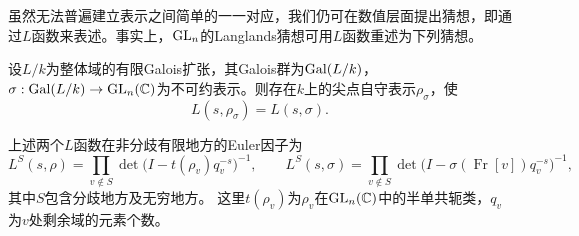 虽然无法普遍建立表示之间简单的一一对应，我们仍可在数值层面提出猜想，即通过$L$函数来表述。事实上，$\operatorname{GL}_n$的Langlands猜想可用$L$函数重述为下列猜想。
\begin{conjecture}[Langlands互反猜想]\label{L20S2O3}
设$L/k$为整体域的有限Galois扩张，其Galois群为$\operatorname{Gal}(L/k)$，$\sigma:\operatorname{Gal}(L/k)\to\operatorname{GL}_n(\mathbb{C})$为不可约表示。则存在$k$上的尖点自守表示$\rho_\sigma$，使
\[L(s,\rho_\sigma)=L(s,\sigma).\]
\end{conjecture}
上述两个$L$函数在非分歧有限地方的Euler因子为
\[L^S(s,\rho)=\prod_{v\notin S}\det\bigl(I-t(\rho_v)q_v^{-s}\bigr)^{-1},\qquad L^S(s,\sigma)=\prod_{v\notin S}\det\bigl(I-\sigma(\operatorname{Fr}[v])q_v^{-s}\bigr)^{-1},\]
其中$S$包含分歧地方及无穷地方。
这里$t(\rho_v)$为$\rho_v$在$\operatorname{GL}_n(\mathbb{C})$中的半单共轭类，$q_v$为$v$处剩余域的元素个数。

